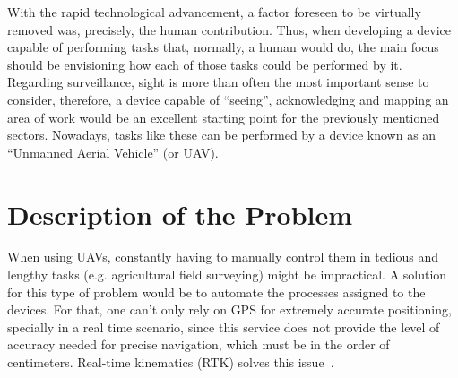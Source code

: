 With the rapid technological advancement, a factor foreseen to be virtually removed was, precisely, the human contribution. Thus, when developing a device capable of performing tasks that, normally, a human would do, the main focus should be envisioning how each of those tasks could be performed by it.
Regarding surveillance, sight is more than often the most important sense to consider, therefore, a device capable of ``seeing'', acknowledging and mapping an area of work would be an excellent starting point for the previously mentioned sectors. Nowadays, tasks like these can be performed by a device known as an ``Unmanned Aerial Vehicle'' (or UAV).


\section{Description of the Problem}\label{I_description}



When using UAVs, constantly having to manually control them in tedious and lengthy tasks (e.g. agricultural field surveying) might be impractical.
A solution for this type of problem would be to automate the processes assigned to the devices. For that, one can't only rely on GPS for extremely accurate positioning, specially in a real time scenario, since this service does not provide the level of accuracy needed for precise navigation, which must be in the order of centimeters. Real-time kinematics (RTK) solves this issue~\cite{gps_USGov,8714161}.

